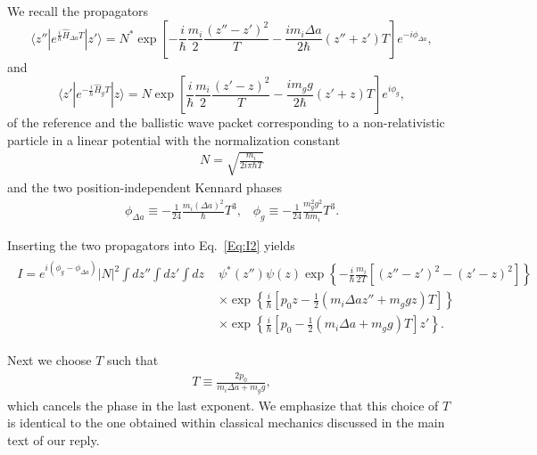 \documentclass[aps,prx,onecolumn,superscriptaddress,longbibliography]{revtex4-2}
\begin{document}
\begin{appendix}
We recall the propagators \cite{T3}
\begin{equation}
     \langle z'' | e^{\frac{i}{\hbar} \hat{H}_{\Delta a} T} | z' \rangle =N^* \exp \left[ -\frac{i}{\hbar} \frac{m_i}{2} \frac{(z'' - z')^2}{T} -\frac{i m_i\Delta a}{2 \hbar} (z'' + z')  T\right]e^{-i \phi_{\Delta a}},
     \label{Eq:Ga}
\end{equation}
and
\begin{equation}
    \langle z' | e^{-\frac{i}{\hbar} \hat{H}_g T} | z \rangle = N\exp \left[\frac{i}{\hbar} \frac{m_i}{2} \frac{(z' - z)^2}{T} - \frac{i m_g g}{2 \hbar} (z' + z)  T \right] e^{i \phi_g},
    \label{Eq:Gg}
\end{equation}
of the reference and the ballistic wave packet corresponding to a non-relativistic particle in a linear potential
with the normalization constant
\begin{align}
    N = \sqrt{\frac{m_i}{2 i \pi \hbar T}}
    \label{Eq:N}
\end{align}
and the two position-independent Kennard phases
\begin{align}
    \phi_{\Delta a} \equiv - \frac{1}{24} \frac{m_i(\Delta a)^2}{\hbar} T^3,\;\;\;\phi_{g} \equiv - \frac{1}{24} \frac{m_g^2 g^2}{\hbar m_i} T^3.
\end{align}


Inserting the two propagators into Eq.~\eqref{Eq:I2} yields
\begin{align}
\begin{split}
    I = e^{i \left(\phi_g -\phi_{\Delta a}\right)} |N|^2 \int dz'' \!\! \int dz' \!\!\int dz \,\, &\psi^*(z'') \psi(z) \exp \left\{ - \frac{i}{\hbar} \frac{m_i}{2T} \left[ (z'' - z')^2 - (z' - z)^2 \right]
    \right\} \\
    &\times \exp \left\{\frac{i}{\hbar}\left[p_0 z- \frac{1}{2}\left(m_i\Delta a z''+m_g g z\right)T\right]\right\}\\
    &\times\exp \left\{\frac{i}{\hbar}\left[p_0 - \frac{1}{2}\left(m_i\Delta a+m_g g\right)T\right]z'\right\}.
    \label{Eq.I8}
\end{split}
\end{align}

Next we choose $T$ such that
\begin{align}
    T\equiv \frac{2p_0}{m_i\Delta a+m_g g},
    \label{Eq:T}
\end{align}
which cancels the phase in the last exponent. We emphasize that this choice of $T$ is identical to the one obtained within classical mechanics discussed in the main text of our reply.


\end{appendix}
\end{document}
